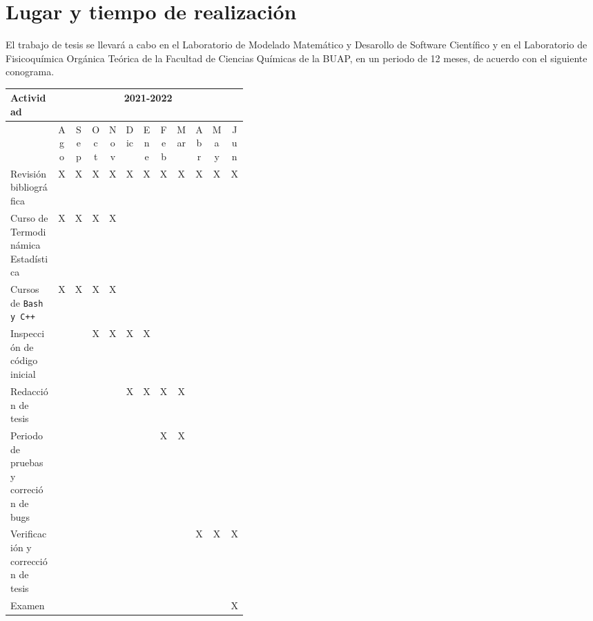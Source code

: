 \documentclass[12pt]{article}
\begin{document}
\newpage


\section*{Lugar y tiempo de realización}
El trabajo de tesis se llevará a cabo en el Laboratorio de Modelado Matemático y Desarollo de Software Científico y en el Laboratorio de Fisicoquímica Orgánica Teórica de la Facultad de Ciencias Químicas de la BUAP, en un periodo de 12 meses, de acuerdo con el siguiente conograma.
\vspace{1cm}
\begin{table}[hbp!]
\centering
\footnotesize
\setlength{\tabcolsep}{2.0pt}
\begin{tabular}{||p{0.4\linewidth}|c|c|c|c|c|c|c|c|c|c|c||}
\hline
\textbf{Actividad} & \multicolumn{11}{|c||}{2021-2022}\\\hline
& Ago & Sep & Oct & Nov & Dic & Ene & Feb & Mar & Abr & May & Jun\\\hline
Revisión bibliográfica & X & X & X & X & X & X & X & X & X & X & X\\\hline
Curso de Termodinámica Estadística & X & X & X & X & & & & & & & \\\hline
Cursos de \texttt{Bash y C++} & X & X & X & X & & & & & & & \\\hline
Inspección de código inicial & & & X & X & X & X & & & & & \\\hline
Redacción de tesis &  &  &  &  & X & X & X & X & & & \\\hline
Periodo de pruebas y correción de bugs & & & & & & & X & X & & & \\\hline
Verificación y corrección de tesis & & & & & & & & & X & X & X \\\hline
Examen &  &  &  &  &  &  &  &  &  &  & X \\\hline
\end{tabular}
\end{table}
\newpage
 

\end{document}
